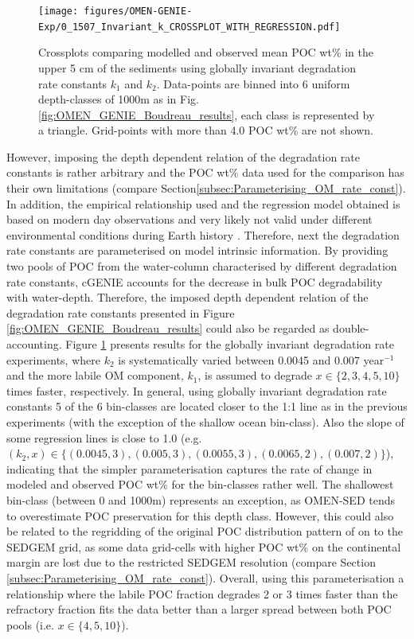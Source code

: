\documentclass[gmd, manuscript]{copernicus}
\begin{document}
\begin{figure}[htbp]
\begin{center}
	\texttt{[image: figures/OMEN-GENIE-Exp/0\_1507\_Invariant\_k\_CROSSPLOT\_WITH\_REGRESSION.pdf]}
	\caption{Crossplots comparing modelled and observed mean POC wt\% in the upper 5 cm of the sediments using globally invariant degradation rate constants $k_1$ and $k_2$. 
	Data-points are binned into 6 uniform depth-classes of 1000m as in Fig. \ref{fig:OMEN_GENIE_Boudreau_results}, each class is represented by a triangle. 
	Grid-points with more than 4.0 POC wt\% are not shown.}\label{fig:OMEN_GENIE_invariant_results}
\end{center}
\end{figure}

However, imposing the depth dependent relation of the degradation rate constants is rather arbitrary and the POC wt\% data used for the comparison has their own limitations (compare Section\ref{subsec:Parameterising_OM_rate_const}). 
In addition, the empirical relationship used \citep{boudreau1997diagenetic} and the regression model obtained is based on modern day observations and very likely not valid under different environmental conditions during Earth 
history \citep[e.g.][]{hulse_understanding_2017}.
Therefore, next the degradation rate constants are parameterised on model intrinsic information. By providing two pools of POC from the water-column characterised by different degradation rate constants, cGENIE accounts 
for the decrease in bulk POC degradability with water-depth. Therefore, the imposed depth dependent relation of the degradation rate constants presented in Figure \ref{fig:OMEN_GENIE_Boudreau_results} could also be regarded as 
double-accounting. Figure \ref{fig:OMEN_GENIE_invariant_results} presents results for the globally invariant degradation rate experiments, where $k_2$ is systematically varied between 0.0045 and 0.007 year$^{-1}$ and 
the more labile OM component, $k_1$, is assumed to degrade $x \in \{2, 3, 4, 5, 10\}$ times faster, respectively. 
In general, using globally invariant degradation rate constants 5 of the 6 bin-classes are located closer to the 1:1 line as in the previous experiments (with the exception 
of the shallow ocean bin-class). Also the slope of some regression lines is close to 1.0 
(e.g. $(k_2, x) \in \{ (0.0045, 3),  (0.005, 3), (0.0055, 3), (0.0065, 2), (0.007, 2)\}$), indicating that the simpler parameterisation captures the rate of change in modeled and observed POC wt\% for the bin-classes rather well. 
The shallowest bin-class (between 0 and 1000m) represents an exception, as OMEN-SED tends to overestimate POC preservation for this depth class. However, this could also be related to the regridding of the original POC distribution 
pattern of \citep{seiter_organic_2004} on to the SEDGEM grid, as some data grid-cells with higher POC wt\% on the continental margin are lost due to the restricted SEDGEM resolution (compare Section \ref{subsec:Parameterising_OM_rate_const}). 
Overall, using this parameterisation a relationship where the labile POC fraction degrades 2 or 3 times faster than the refractory fraction fits the 
\citet{seiter_organic_2004} data better than a larger spread between both POC pools (i.e. $x \in \{4, 5, 10\}$).
\end{document}
